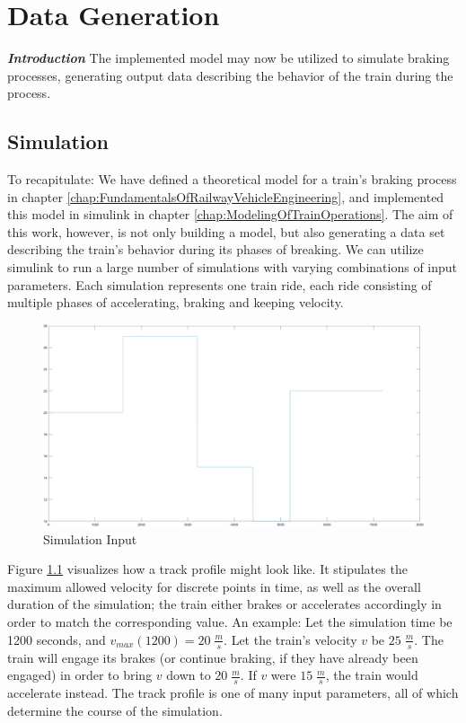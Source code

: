 \chapter{Data Generation}
\label{chap:DataGeneration}
\par\noindent
\textit{\textbf{Introduction}} The implemented model may now be utilized to simulate braking processes, generating output data describing the behavior of the train during the process. 

\section{Simulation}
\label{sec:Simulation}
\par\noindent
To recapitulate: We have defined a theoretical model for a train's braking process in chapter \ref{chap:FundamentalsOfRailwayVehicleEngineering}, and implemented this model in simulink in chapter \ref{chap:ModelingOfTrainOperations}. The aim of this work, however, is not only building a model, but also generating a data set describing the train's behavior during its phases of breaking. We can utilize simulink to run a large number of simulations with varying combinations of input parameters. Each simulation represents one train ride, each ride consisting of multiple phases of accelerating, braking and keeping velocity. 

\begin{figure}[H]
	\centering
	\includegraphics[width=\linewidth]{./pic/input}
	\caption{Simulation Input}
	\label{fig:siminput}
\end{figure}

\par\noindent
Figure \ref{fig:siminput} visualizes how a track profile might look like. It stipulates the maximum allowed velocity for discrete points in time, as well as the overall duration of the simulation; the train either brakes or accelerates accordingly in order to match the corresponding value. An example: Let the simulation time be 1200 seconds, and $v_{max}(1200)=20 \; \frac{m}{s}$. Let the train's velocity $v$ be $25 \; \frac{m}{s}$. The train will engage its brakes (or continue braking, if they have already been engaged) in order to bring $v$ down to $20 \; \frac{m}{s}$. If $v$ were $15 \; \frac{m}{s}$, the train would accelerate instead. The track profile is one of many input parameters, all of which determine the course of the simulation. 

